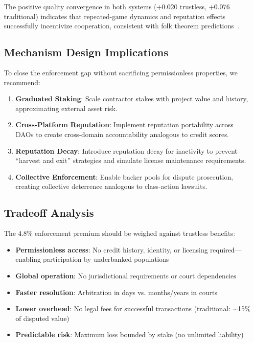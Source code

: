 \documentclass[11pt,a4paper]{article}
\begin{document}
The positive quality convergence in both systems (+0.020 trustless, +0.076 traditional) indicates that repeated-game dynamics and reputation effects successfully incentivize cooperation, consistent with folk theorem predictions~\citep{fudenberg1991game}.

\subsection{Mechanism Design Implications}

To close the enforcement gap without sacrificing permissionless properties, we recommend:

\begin{enumerate}
    \item \textbf{Graduated Staking}: Scale contractor stakes with project value and history, approximating external asset risk.

    \item \textbf{Cross-Platform Reputation}: Implement reputation portability across DAOs to create cross-domain accountability analogous to credit scores.

    \item \textbf{Reputation Decay}: Introduce reputation decay for inactivity to prevent ``harvest and exit'' strategies and simulate license maintenance requirements.

    \item \textbf{Collective Enforcement}: Enable backer pools for dispute prosecution, creating collective deterrence analogous to class-action lawsuits.
\end{enumerate}

\subsection{Tradeoff Analysis}

The 4.8\% enforcement premium should be weighed against trustless benefits:

\begin{itemize}
    \item \textbf{Permissionless access}: No credit history, identity, or licensing required---enabling participation by underbanked populations
    \item \textbf{Global operation}: No jurisdictional requirements or court dependencies
    \item \textbf{Faster resolution}: Arbitration in days vs. months/years in courts
    \item \textbf{Lower overhead}: No legal fees for successful transactions (traditional: $\sim$15\% of disputed value)
    \item \textbf{Predictable risk}: Maximum loss bounded by stake (no unlimited liability)
\end{itemize}
\end{document}
